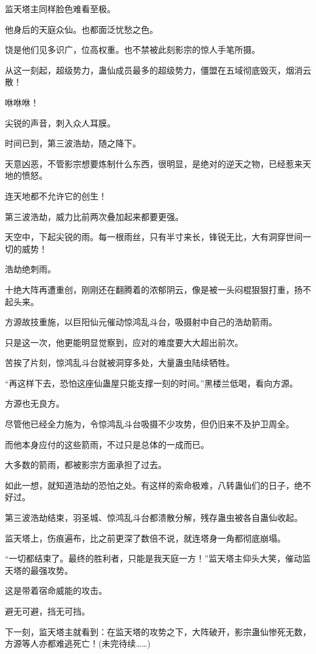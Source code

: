 \begin{this_body}
监天塔主同样脸色难看至极。

他身后的天庭众仙。也都面泛忧愁之色。

饶是他们见多识广，位高权重。也不禁被此刻影宗的惊人手笔所摄。

从这一刻起，超级势力，蛊仙成员最多的超级势力，僵盟在五域彻底毁灭，烟消云散！

咻咻咻！

尖锐的声音，刺入众人耳膜。

时间已到，第三波浩劫，随之降下。

天意凶恶，不管影宗想要炼制什么东西，很明显，是绝对的逆天之物，已经惹来天地的愤怒。

连天地都不允许它的创生！

第三波浩劫，威力比前两次叠加起来都要更强。

天空中，下起尖锐的雨。每一根雨丝，只有半寸来长，锋锐无比，大有洞穿世间一切的威势！

浩劫绝刺雨。

十绝大阵再遭重创，刚刚还在翻腾着的浓郁阴云，像是被一头闷棍狠狠打重，扬不起头来。

方源故技重施，以巨阳仙元催动惊鸿乱斗台，吸摄射中自己的浩劫箭雨。

只是这一次，他更能明显觉察到，应对的难度要大大超出前次。

苦挨了片刻，惊鸿乱斗台就被洞穿多处，大量蛊虫陆续牺牲。

“再这样下去，恐怕这座仙蛊屋只能支撑一刻的时间。”黑楼兰低喝，看向方源。

方源也无良方。

尽管他已经全力施为，令惊鸿乱斗台吸摄不少攻势，但仍旧来不及护卫周全。

而他本身应付的这些箭雨，不过只是总体的一成而已。

大多数的箭雨，都被影宗方面承担了过去。

如此一想，就知道浩劫的恐怕之处。有这样的索命极难，八转蛊仙们的日子，绝不好过。

第三波浩劫结束，羽圣城、惊鸿乱斗台都溃散分解，残存蛊虫被各自蛊仙收起。

监天塔上，伤痕遍布，比之前更深了数倍不说，就连塔身一角都彻底崩塌。

“一切都结束了。最终的胜利者，只能是我天庭一方！”监天塔主仰头大笑，催动监天塔的最强攻势。

这是带着宿命威能的攻击。

避无可避，挡无可挡。

下一刻，监天塔主就看到：在监天塔的攻势之下，大阵破开，影宗蛊仙惨死无数，方源等人亦都难逃死亡！(未完待续……)


\end{this_body}
